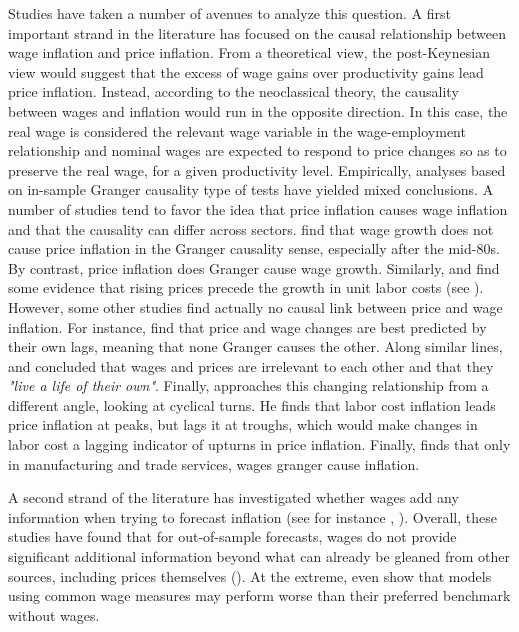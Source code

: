 \documentclass[11pt]{article}
\begin{document}
Studies have taken a number of avenues to analyze this question. A first important strand in the literature has focused on the causal relationship between wage inflation and price inflation. From a theoretical view, the post-Keynesian view would suggest that the excess of wage gains over productivity gains lead price inflation. Instead, according to the neoclassical theory, the causality between wages and inflation would run in the opposite direction. In this case, the real wage is considered the relevant wage variable in the wage-employment relationship and nominal wages are expected to respond to price changes so as to preserve the real wage, for a given productivity level. Empirically, analyses based on in-sample Granger causality type of tests have yielded mixed conclusions. A number of studies tend to favor the idea that price inflation causes wage inflation and that the causality can differ across sectors. \cite{Hu_Toussaint-Comeau_2010} find that wage growth does not cause price inflation in the Granger causality sense, especially after the mid-80s.  By contrast, price inflation does Granger cause wage growth. Similarly, \cite{EmeryChang96} and \cite{Sbordone_02} find some evidence that rising prices precede the growth in unit labor costs (see \cite{Bidder2015}). However, some other studies find actually no causal link between price and wage inflation. For instance, \cite{Hess_Schweitzer_2000} find that price and wage changes are best predicted by their own lags, meaning that none Granger causes the other. Along similar lines, \cite{Gordon_88} and \cite{Darrat1994} concluded that wages and prices are irrelevant to each other and that they \textit{"live a life of their own"}. Finally, \cite{Banerji2005} approaches this changing relationship from a different angle, looking at cyclical turns. He finds that labor cost inflation leads price inflation at peaks, but lags it at troughs, which would make changes in labor cost a lagging indicator of upturns in price inflation. Finally, \cite{Rissman1995} finds that only in manufacturing and trade services, wages granger cause inflation.

A second strand of the literature has investigated whether wages add any information when trying to forecast inflation (see for instance \cite{Stock_Watson_2008}, \cite{Knotek_Zaman_2014}). Overall, these studies have found that for out-of-sample forecasts, wages do not provide significant additional information beyond what can already be gleaned from other sources, including prices themselves (\cite{Bidder2015}). At the extreme, \cite{Stock_Watson_2008} even show that models using common wage measures may perform worse than their preferred benchmark without wages. 
\end{document}
